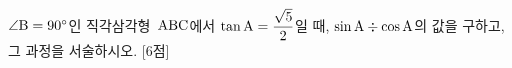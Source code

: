 $\angle\mathrm{B}=90^\circ$인 직각삼각형~$\mathrm{ABC}$에서 $\tan\mathrm{A}=\dfrac{\sqrt{5}}{2}$일 때, $\sin\mathrm{A}\div\cos\mathrm{A}$의 값을 구하고, 그 과정을 서술하시오. \mbox{[6점]}
